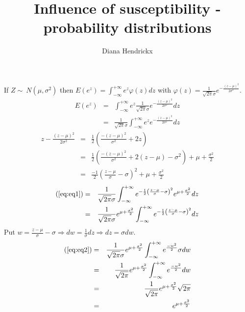 \documentclass[a4paper]{article}
\begin{document}
\title{Influence of susceptibility - probability distributions}
\author{Diana Hendrickx}
\maketitle
If $Z \sim\ N\left(\mu, \sigma^{2}\right)$ then $E\left(e^{z}\right) = \int^{+\infty}_{-\infty} e^{z} \varphi\left(z\right) dz$ with $\varphi\left(z\right) = \frac{1}{\sqrt{2\pi}\sigma}e^{-\frac{\left(z-\mu\right)^{2}}{2 \sigma^{2}}}$.
\begin{eqnarray}
E\left(e^{z}\right) &=& \int^{+\infty}_{-\infty} e^{z} \frac{1}{\sqrt{2\pi}\sigma}e^{-\frac{\left(z-\mu\right)^{2}}{2 \sigma^{2}}} dz \nonumber \\
&=& \frac{1}{\sqrt{2\pi}\sigma} \int^{+\infty}_{-\infty} e^{z} e^{-\frac{\left(z-\mu\right)^{2}}{2 \sigma^{2}}} dz \label{eq:eq1}
\end{eqnarray} 
\begin{eqnarray}
z - \frac{\left(z-\mu\right)^{2}}{2 \sigma^{2}} & = & \frac{1}{2}\left(\frac{-\left(z-\mu\right)^{2}}{\sigma^{2}} + 2z\right) \nonumber \\
&=& \frac{1}{2}\left(\frac{-\left(z-\mu\right)^{2}}{\sigma^{2}} + 2\left(z-\mu\right)-\sigma^2\right) + \mu + \frac{\sigma^2}{2} \nonumber \\
&=& \frac{-1}{2}\left(\frac{z-\mu}{\sigma} - \sigma\right)^{2} + \mu + \frac{\sigma^2}{2} \nonumber
\end{eqnarray}
\begin{eqnarray}
\left(\ref{eq:eq1}\right) &=& \frac{1}{\sqrt{2\pi}\sigma} \int^{+\infty}_{-\infty} e^{-\frac{1}{2}\left(\frac{z-\mu}{\sigma} - \sigma\right)^{2}} e^{\mu + \frac{\sigma^2}{2}} dz \nonumber \\
&=& \frac{1}{\sqrt{2\pi}\sigma} e^{\mu + \frac{\sigma^2}{2}} \int^{+\infty}_{-\infty} e^{-\frac{1}{2}\left(\frac{z-\mu}{\sigma} - \sigma\right)^{2}} dz \label{eq:eq2}
\end{eqnarray}
Put $w = \frac{z-\mu}{\sigma} - \sigma \Rightarrow dw = \frac{1}{\sigma} dz \Rightarrow dz = \sigma dw$.
\begin{eqnarray}
\left(\ref{eq:eq2}\right) &=& \frac{1}{\sqrt{2\pi}\sigma} e^{\mu + \frac{\sigma^2}{2}} \int^{+\infty}_{-\infty} e^{\frac{-w^{2}}{2}} \sigma dw \nonumber \\
&=& \frac{1}{\sqrt{2\pi}}e^{\mu + \frac{\sigma^2}{2}} \int^{+\infty}_{-\infty} e^{\frac{-w^{2}}{2}} dw \nonumber \\
&=& \frac{1}{\sqrt{2\pi}}e^{\mu + \frac{\sigma^2}{2}} \sqrt{2\pi} \nonumber \\
&=& e^{\mu + \frac{\sigma^2}{2}} \nonumber
\end{eqnarray}
\end{document}
